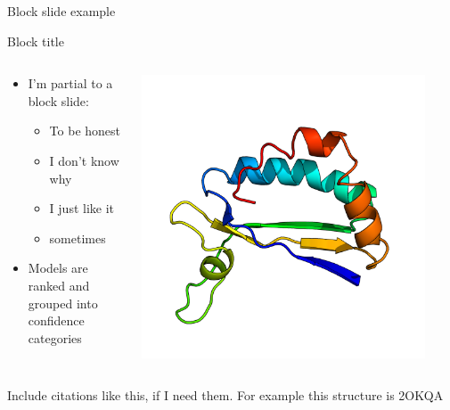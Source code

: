 \documentclass{beamer}
\begin{document}
\begin{frame}{Block slide example}
\vspace{5mm}
  \begin{block}{Block title}
    \begin{columns}
      \begin{column}{0.45\textwidth}
  \begin{itemize}
  \setlength{\itemsep}{1em}
    \item I'm partial to a block slide:
      \begin{itemize}
        \item To be honest 
        \item I don't know why
        \item I just like it 
        \item sometimes
      \end{itemize}
    \item Models are ranked and grouped into confidence categories
  \end{itemize}
\end{column}
\begin{column}{0.5\textwidth}
  \centering
  \includegraphics[width=0.9\textwidth]{2OKQA.png}
\end{column}
\end{columns}
\end{block}
\vspace{10mm}
\tiny{Include citations like this, if I need them. For example this structure is 2OKQA }

\end{frame}
\end{document}
